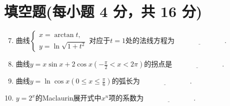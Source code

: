 \documentclass[../main.tex]{subfiles}
\begin{document}
\section{填空题(每小题 4 分，共 16 分)}
\begin{enumerate}
    \setcounter{enumi}{6}
    \item 曲线$\begin{cases}
                  x = \arctan t, \\
                  y=\ln\sqrt{1+t^{2}}
              \end{cases}$对应于$t=1$处的法线方程为$\underline{\hspace{3cm}}$.
          \vspace{0.5em}

    \item 曲线$y=x\sin x+2\cos x\left(-\frac{\pi}{2}<x<2\pi\right)$的拐点是$\underline
              {\hspace{3cm}}$.
          \vspace{0.5em}

    \item 曲线$y=\ln\cos x\left(0\leq x\leq\frac{\pi}{6}\right)$的弧长为$\underline
              {\hspace{3cm}}$.
          \vspace{0.5em}

    \item $y=2^{x}$的Maclaurin展开式中$x^{n}$项的系数为$\underline{\hspace{3cm}
              }$.
\end{enumerate}
\end{document}
